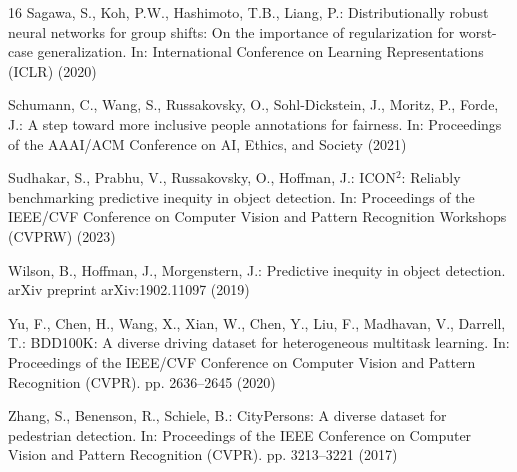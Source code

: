 \documentclass[runningheads]{llncs}
\begin{document}
\begin{thebibliography}{16}
Sagawa, S., Koh, P.W., Hashimoto, T.B., Liang, P.: Distributionally robust
  neural networks for group shifts: On the importance of regularization for
  worst-case generalization. In: International Conference on Learning
  Representations (ICLR) (2020)

Schumann, C., Wang, S., Russakovsky, O., Sohl-Dickstein, J., Moritz, P., Forde,
  J.: A step toward more inclusive people annotations for fairness. In:
  Proceedings of the AAAI/ACM Conference on AI, Ethics, and Society (2021)

Sudhakar, S., Prabhu, V., Russakovsky, O., Hoffman, J.: {ICON}$^2$: Reliably
  benchmarking predictive inequity in object detection. In: Proceedings of the
  IEEE/CVF Conference on Computer Vision and Pattern Recognition Workshops
  (CVPRW) (2023)

Wilson, B., Hoffman, J., Morgenstern, J.: Predictive inequity in object
  detection. arXiv preprint arXiv:1902.11097 (2019)

Yu, F., Chen, H., Wang, X., Xian, W., Chen, Y., Liu, F., Madhavan, V., Darrell,
  T.: {BDD100K}: A diverse driving dataset for heterogeneous multitask
  learning. In: Proceedings of the IEEE/CVF Conference on Computer Vision and
  Pattern Recognition (CVPR). pp. 2636--2645 (2020)

Zhang, S., Benenson, R., Schiele, B.: {CityPersons}: A diverse dataset for
  pedestrian detection. In: Proceedings of the IEEE Conference on Computer
  Vision and Pattern Recognition (CVPR). pp. 3213--3221 (2017)

\end{thebibliography}
\end{document}

